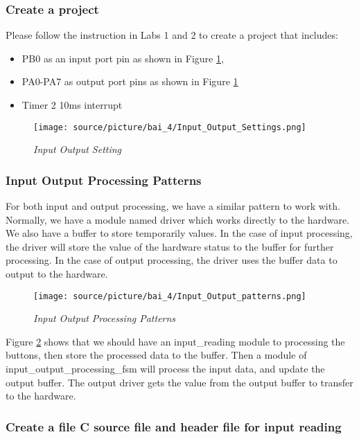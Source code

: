 \subsubsection{Create a project}
Please follow the instruction in Labs 1 and 2 to create a project that includes: 
\begin{itemize}
    \item PB0 as an input port pin as shown in Figure \ref{bai4_pic_input_output_setting}, 
    \item PA0-PA7 as output port pins as shown in Figure \ref{bai4_pic_input_output_setting}
    \item Timer 2 10ms interrupt
\end{itemize}

\begin{figure}[!htp]
    \centering
    \texttt{[image: source/picture/bai\_4/Input\_Output\_Settings.png]}
    \caption{\textit{Input Output Setting}}
    \label{bai4_pic_input_output_setting}
\end{figure}

\subsubsection{Input Output Processing Patterns}
For both input and output processing, we have a similar pattern to work with. Normally, we have a module named driver which works directly to the hardware. We also have a buffer to store temporarily values. In the case of input processing, the driver will store the value of the hardware status to the buffer for further processing. In the case of output processing, the driver uses the buffer data to output to the hardware. 

\begin{figure}[!htp]
    \centering
    \texttt{[image: source/picture/bai\_4/Input\_Output\_patterns.png]}
    \caption{\textit{Input Output Processing Patterns}}
    \label{bai4_pic_Input_Output_patterns}
\end{figure}

Figure \ref{bai4_pic_Input_Output_patterns} shows that we should have an input\_reading module to processing the buttons, then store the processed data to the buffer. Then a module of input\_output\_processing\_fsm will process the input data, and update the output buffer. The output driver gets the value from the output buffer to transfer to the hardware. 

\subsubsection{Create a file C source file and header file for input reading}

